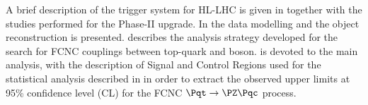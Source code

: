 A brief description of the trigger system for HL-LHC is given in  together with the studies performed for the Phase-II upgrade. 
In   the data modelling and the object reconstruction is presented.
 describes the analysis strategy developed for the search for FCNC couplings between top-quark and \PZ boson.  is devoted to the main analysis, with the description of Signal and Control Regions used for the statistical analysis described in  in order to extract the observed upper limits at 95\% confidence level (CL) for the FCNC $\Pqt\rightarrow\PZ\Pqc$ process.
 
 